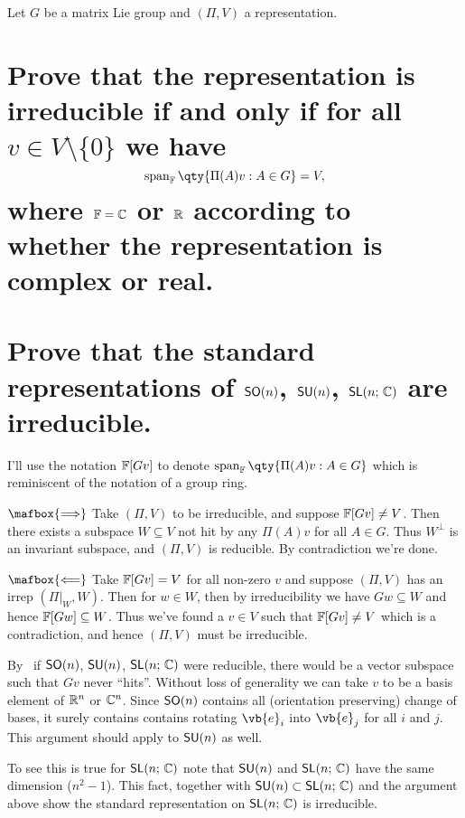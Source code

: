 \documentclass[
	pages,
	boxes,
	color=WildStrawberry
]{homework}
\begin{document}
\begin{problem}
Let $G$ be a matrix Lie group and $(\Pi, V)$ a representation.
\begin{parts}
	\part{Prove that the representation is irreducible if and only if for all $v \in V \setminus \{0\}$ we have
		\[
			\vspan_\mathbb{F}\qty{\Pi(A)v : A \in G} = V,
		\]
		where $\mathbb{F} = \mathbb{C}$ or $\mathbb{R}$ according to whether the representation is complex or real.}\label{part:1a}
	\part{Prove that the standard representations of $\mathsf{SO}(n)$, $\mathsf{SU}(n)$, $\mathsf{SL}(n;\, \mathbb{C})$ are irreducible.}\label{part:1b}
\end{parts}
\end{problem}

\begin{solution}
	I'll use the notation $\mathbb{F} [Gv]$ to denote $\vspan_\mathbb{F}\qty{\Pi(A)v : A \in G}$ which is reminiscent of the notation of a group ring.

	\ref{part:1a}
	$\mafbox{\Longrightarrow}$
	Take $(\Pi, V)$ to be irreducible, and suppose $\mathbb{F}[Gv]\neq V$. Then there exists a subspace $W\subseteq V$ not hit by any $\Pi(A)v$ for all $A\in G$. Thus $W^\perp$ is an invariant subspace, and $(\Pi, V)$ is reducible. By contradiction we're done.

	\noindent $\mafbox{\Longleftarrow}$
	Take $\mathbb{F}[Gv] = V$ for all non-zero $v$ and suppose $(\Pi, V)$ has an irrep $(\Pi|_W, W)$. Then for $w\in W$, then by irreducibility we have $Gw\subseteq W$ and hence $\mathbb{F}[Gw]\subseteq W$. Thus we've found a $v\in V$ such that $\mathbb{F}[Gv] \neq V$ which is a contradiction, and hence $(\Pi, V)$ must be irreducible.

	\ref{part:1b}
	By~\ref{part:1a} if $\mathsf{SO}(n)$, $\mathsf{SU}(n)$, $\mathsf{SL}(n;\, \mathbb{C})$ were reducible, there would be a vector subspace such that $Gv$ never ``hits''. Without loss of generality we can take $v$ to be a basis element of $\mathbb{R}^n$ or $\mathbb{C}^n$. Since $\mathsf{SO}(n)$ contains all (orientation preserving) change of bases, it surely contains contains rotating $\vb{e}_i$ into $\vb{e}_j$ for all $i$ and $j$. This argument should apply to $\mathsf{SU}(n)$ as well.

	To see this is true for $\mathsf{SL}(n;\, \mathbb{C})$ note that $\mathsf{SU}(n)$ and $\mathsf{SL}(n;\, \mathbb{C})$ have the same dimension ($n^2 - 1$). This fact, together with $\mathsf{SU}(n)\subset \mathsf{SL}(n;\, \mathbb{C})$ and the argument above show the standard representation on $\mathsf{SL}(n;\, \mathbb{C})$ is irreducible.
\end{solution}
\end{document}
